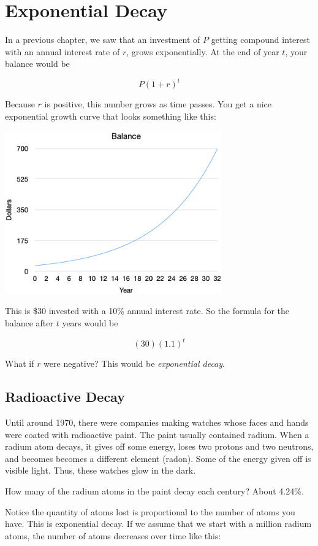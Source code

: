 \chapter{Exponential Decay}

In a previous chapter, we saw that an investment of $P$ getting
compound interest with an annual interest rate of $r$, grows
exponentially. At the end of year $t$, your balance would be

$$P\left(1 + r\right)^t$$

Because $r$ is positive, this number grows as time passes.  You get a
nice exponential growth curve that looks something like this:

\includegraphics[width=0.7\textwidth]{exponential_growth.png}

This is \$30 invested with a 10\% annual interest rate. So the formula
for the balance after $t$ years would be

$$(30)(1.1)^t$$

What if $r$ were negative? This would be \textit{exponential decay}.

\section{Radioactive Decay}

Until around 1970, there were companies making watches whose faces and
hands were coated with radioactive paint. The paint usually contained
radium. When a radium atom decays, it gives off some energy, loses two
protons and two neutrons, and becomes becomes a different element
(radon). Some of the energy given off is visible light. Thus, these
watches glow in the dark.

How many of the radium atoms in the paint decay each century? About 4.24\%.

Notice the quantity of atoms lost is proportional to the number of
atoms you have. This is exponential decay. If we assume that we start
with a million radium atoms, the number of atoms decreases over time like this:

